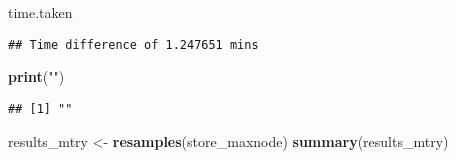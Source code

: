 \documentclass[
]{article}
\newenvironment{Shaded}{\begin{snugshade}}{\end{snugshade}}
\newcommand{\KeywordTok}[1]{\textcolor[rgb]{0.13,0.29,0.53}{\textbf{#1}}}
\newcommand{\NormalTok}[1]{#1}
\newcommand{\StringTok}[1]{\textcolor[rgb]{0.31,0.60,0.02}{#1}}
\begin{document}
\begin{Shaded}
\begin{Highlighting}[]
\NormalTok{time.taken}
\end{Highlighting}
\end{Shaded}

\begin{verbatim}
## Time difference of 1.247651 mins
\end{verbatim}

\begin{Shaded}
\begin{Highlighting}[]
\KeywordTok{print}\NormalTok{(}\StringTok{""}\NormalTok{)}
\end{Highlighting}
\end{Shaded}

\begin{verbatim}
## [1] ""
\end{verbatim}

\begin{Shaded}
\begin{Highlighting}[]
\NormalTok{results_mtry <-}\StringTok{ }\KeywordTok{resamples}\NormalTok{(store_maxnode)}
\KeywordTok{summary}\NormalTok{(results_mtry)}
\end{Highlighting}
\end{Shaded}
\end{document}
